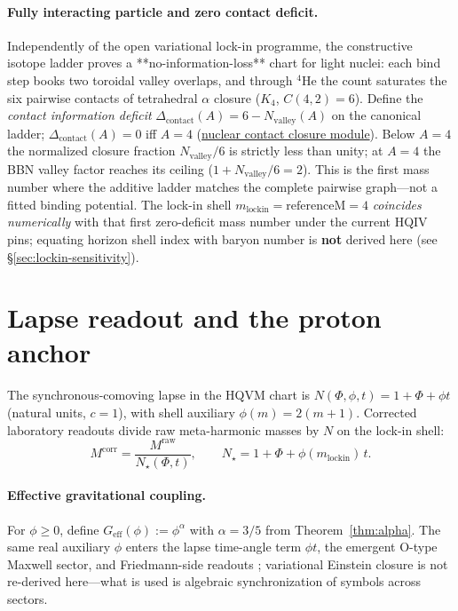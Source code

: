 \documentclass[11pt,notitlepage]{amsart}
\begin{document}
\paragraph{Fully interacting particle and zero contact deficit.}
Independently of the open variational lock-in programme, the constructive isotope
ladder proves a **no-information-loss** chart for light nuclei: each bind step books
two toroidal valley overlaps, and through ${}^4\mathrm{He}$ the count saturates the six
pairwise contacts of tetrahedral $\alpha$ closure ($K_{4}$, $C(4,2)=6$). Define the
\emph{contact information deficit} $\Delta_{\mathrm{contact}}(A)=6-N_{\mathrm{valley}}(A)$
on the canonical ladder; $\Delta_{\mathrm{contact}}(A)=0$ iff $A=4$
(\hyperref[lean:nuclear-contact-closure]{nuclear contact closure module}).
Below $A=4$ the normalized closure fraction $N_{\mathrm{valley}}/6$ is strictly
less than unity; at $A=4$ the BBN valley factor reaches its ceiling ($1+N_{\mathrm{valley}}/6=2$).
This is the first mass number where the additive ladder matches the complete pairwise
graph---not a fitted binding potential. The lock-in shell
$m_{\mathrm{lockin}}=\mathrm{referenceM}=4$ \emph{coincides numerically} with that
first zero-deficit mass number under the current HQIV pins; equating horizon shell index
with baryon number is \textbf{not} derived here (see \S\ref{sec:lockin-sensitivity}).

\section{Lapse readout and the proton anchor}
\label{sec:lapse}

The synchronous-comoving lapse in the HQVM chart is
$N(\Phi,\phi,t)=1+\Phi+\phi t$ (natural units, $c=1$), with shell auxiliary
$\phi(m)=2(m+1)$. Corrected laboratory readouts divide raw meta-harmonic masses by
$N$ on the lock-in shell:
\[
  M^{\mathrm{corr}}=\frac{M^{\mathrm{raw}}}{N_{\star}(\Phi,t)},
  \qquad N_{\star}=1+\Phi+\phi(m_{\mathrm{lockin}})\,t.
\]

\paragraph{Effective gravitational coupling.}
For $\phi\ge 0$, define $G_{\mathrm{eff}}(\phi):=\phi^{\alpha}$ with $\alpha=3/5$ from
Theorem~\ref{thm:alpha}. The same real auxiliary $\phi$ enters the lapse time-angle
term $\phi t$, the emergent O-type Maxwell sector, and Friedmann-side readouts
\cite{hqiv-tuft-sm-lagrangian-paper}; variational Einstein closure is not re-derived
here---what is used is algebraic synchronization of symbols across sectors.
\end{document}
